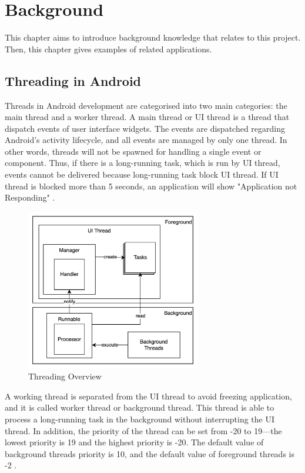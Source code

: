 \chapter{Background}\label{background}

    This chapter aims to introduce background knowledge that relates to this project.
    Then, this chapter gives examples of related applications.

    \section{Threading in Android}
        Threads in Android development are categorised into two main categories: the main thread and a worker thread.
        A main thread or UI thread is a thread that dispatch events of user interface widgets.
        The events are dispatched regarding Android's activity lifecycle,
        and all events are managed by only one thread.
        In other words, threads will not be spawned for handling a single event or component.
        Thus, if there is a long-running task, which is run by UI thread, events cannot be delivered
        because long-running task block UI thread.
        If UI thread is blocked more than 5 seconds,
        an application will show "Application not Responding"  \cite{ANDROID-01}.

        \begin{figure}[!ht]
            \centering
            \includegraphics[width=3in]{images/chapter2/thread-overview.png}
            \caption{Threading Overview}
            \label{thread-overview}
        \end{figure}

        A working thread is separated from the UI thread to avoid freezing application,
            and it is called worker thread or background thread.
            This thread is able to process a long-running task in the background without interrupting the UI thread.
        In addition, the priority of the thread can be set from -20 to 19---the lowest priority is 19 and the highest priority is -20.
            The default value of background threads priority is 10,
            and the default value of foreground threads is -2 \cite{ANDROID-02}.

